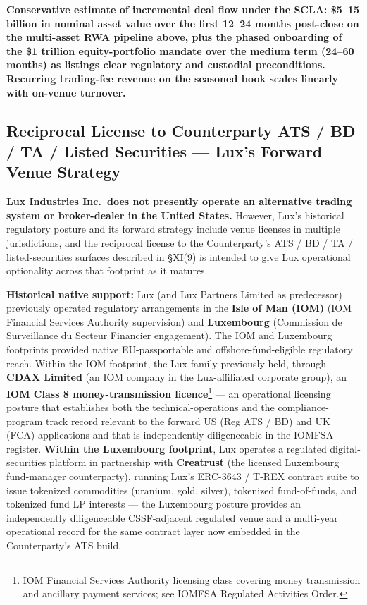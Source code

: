 \documentclass[11pt,letterpaper]{article}
\begin{document}
\textbf{Conservative estimate of incremental deal flow under the
SCLA: \$5--15 billion in nominal asset value over the first 12--24
months post-close on the multi-asset RWA pipeline above, plus the
phased onboarding of the \$1 trillion equity-portfolio mandate over
the medium term (24--60 months) as listings clear regulatory and
custodial preconditions. Recurring trading-fee revenue on the
seasoned book scales linearly with on-venue turnover.}

\subsection*{Reciprocal License to Counterparty ATS / BD / TA / Listed Securities --- Lux's Forward Venue Strategy}

\textbf{Lux Industries Inc.\ does not presently operate an
alternative trading system or broker-dealer in the United States.}
However, Lux's historical regulatory posture and its forward strategy
include venue licenses in multiple jurisdictions, and the reciprocal
license to the Counterparty's ATS / BD / TA / listed-securities
surfaces described in \S XI(9) is intended to give Lux operational
optionality across that footprint as it matures.

\textbf{Historical native support:} Lux (and Lux Partners Limited
as predecessor) previously operated regulatory arrangements in the
\textbf{Isle of Man (IOM)} (IOM Financial Services Authority
supervision) and \textbf{Luxembourg} (Commission de Surveillance du
Secteur Financier engagement). The IOM and Luxembourg footprints
provided native EU-passportable and offshore-fund-eligible regulatory
reach. Within the IOM footprint, the Lux family previously held,
through \textbf{CDAX Limited} (an IOM company in the Lux-affiliated
corporate group), an \textbf{IOM Class 8 money-transmission
licence}\footnote{IOM Financial Services Authority licensing class
covering money transmission and ancillary payment services; see
IOMFSA Regulated Activities Order.} --- an operational licensing
posture that establishes both the technical-operations and the
compliance-program track record relevant to the forward US (Reg
ATS / BD) and UK (FCA) applications and that is independently
diligenceable in the IOMFSA register. \textbf{Within the Luxembourg
footprint}, Lux operates a regulated digital-securities platform
in partnership with \textbf{Creatrust} (the licensed Luxembourg
fund-manager counterparty), running Lux's ERC-3643 / T-REX
contract suite to issue tokenized commodities (uranium, gold,
silver), tokenized fund-of-funds, and tokenized fund LP
interests --- the Luxembourg posture provides an independently
diligenceable CSSF-adjacent regulated venue and a multi-year
operational record for the same contract layer now embedded in
the Counterparty's ATS build.
\end{document}
